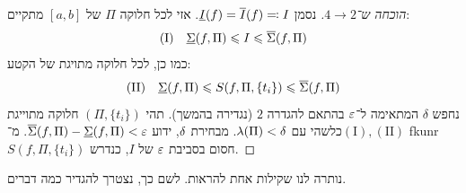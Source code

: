 \documentclass[name=רשימות חדו''א 2א]{../../../tex/classes/noChapterMegasumPreamble}
\begin{document}
	\begin{proof}[הוכחה ש־$4 \to 2$]
		נסמן $\underline{I}(f) = \overline{I}(f) \eqqcolon I$. אזי לכל חלוקה $\Pi$ של $[a, b]$ מתקיים:
		\[ (\mathrm{I}) \quad \underline{\Sigma}(f, \Pi) \leqslant I \leqslant \overline{\Sigma}(f, \Pi) \]
		כמו כן, לכל חלוקה מתויגת של הקטע:
		\[ (\mathrm{II})\quad \underline{\Sigma}(f, \Pi) \leqslant S(f, \Pi, \{t_i\}) \leqslant \overline{\Sigma}(f, \Pi) \]
		נחפש $\delta$ המתאימה ל־$\eg$ בהתאם להגדרה $2$ (נגדירה בהמשך). תהי $(\Pi, \{t_i\})$ חלוקה מתוייגת כלשהי עם $\lambda(\Pi) < \delta$. מבחירת $\delta$, ידוע $\daru(f, \Pi) - \dard(f, \Pi) < \eg$. מ־$(\mathrm{I}), (\mathrm{II})$ fkunr
		$S(f, \Pi, \{t_i\})$ חסום בסביבת $\eg$ של $I$, כנדרש.
	\end{proof}
	נותרה לנו שקילות אחת להראות. לשם כך, נצטרך להגדיר כמה דברים.




\end{document}
